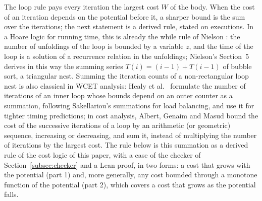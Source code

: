 \documentclass[oneside,english]{amsart}
\numberwithin{equation}{section}
\numberwithin{figure}{section}
\theoremstyle{plain}
\theoremstyle{definition}
\theoremstyle{plain}
\theoremstyle{remark}
\theoremstyle{plain}
\theoremstyle{definition}
\theoremstyle{plain}
\theoremstyle{remark}
\begin{document}
The loop rule pays every iteration the largest cost $W$ of the body. When the cost of an iteration depends on the potential before it, a sharper bound is the sum over the iterations; the next statement is a derived rule, stated on executions. In a Hoare logic for running time, this is already the while rule of Nielson \cite{nielson1987hoare}: the number of unfoldings of the loop is bounded by a variable $z$, and the time of the loop is a solution of a recurrence relation in the unfoldings; Nielson's Section~5 derives in this way the summing series $T(i) = (i - 1) + T(i - 1)$ of bubble sort, a triangular nest. Summing the iteration counts of a non-rectangular loop nest is also classical in WCET analysis: Healy et al.\ \cite{healy2000supporting} formulate the number of iterations of an inner loop whose bounds depend on an outer counter as a summation, following Sakellariou's summations for load balancing, and use it for tighter timing predictions; in cost analysis, Albert, Genaim and Masud \cite{albert2011more} bound the cost of the successive iterations of a loop by an arithmetic (or geometric) sequence, increasing or decreasing, and sum it, instead of multiplying the number of iterations by the largest cost. The rule below is this summation as a derived rule of the cost logic of this paper, with a case of the checker of Section~\ref{subsec:checker} and a Lean proof, in two forms: a cost that grows with the potential (part 1) and, more generally, any cost bounded through a monotone function of the potential (part 2), which covers a cost that grows as the potential falls.
\end{document}
